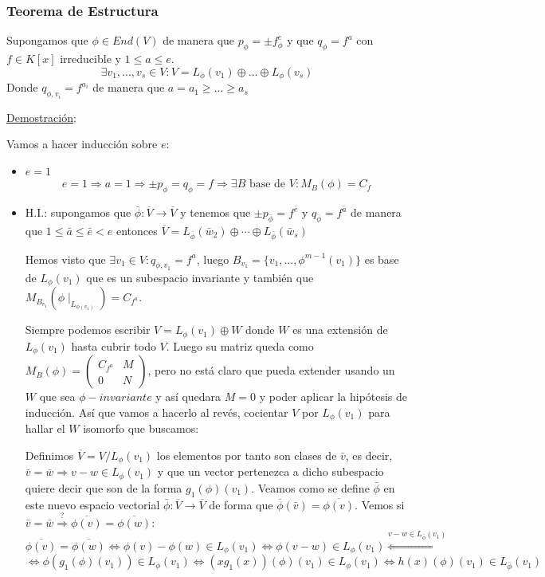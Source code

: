 \documentclass[10pt,a4paper,openright]{book}
\begin{document}
\subsubsection*{Teorema de Estructura}
Supongamos que $\phi\in End(V)$ de manera que $p_\phi =\pm f_\phi^e$ y que $q_\phi=f^a$ con $f\in K[x]$ irreducible y $1\leq a\leq e$.
$$\exists v_1, ..., v_s\in V: V=L_\phi(v_1)\oplus... \oplus L_\phi(v_s)$$
Donde $q_{\phi, v_i}=f^{a_i}$ de manera que $a=a_1\geq ... \geq a_s$

\underline{Demostración}:

Vamos a hacer inducción sobre $e$:
\begin{itemize}
\item $e=1$
$$e=1\Rightarrow a=1\Rightarrow \pm p_\phi=q_\phi=f\Rightarrow \exists B\mbox{ base de }V: M_B(\phi)=C_f$$

\item H.I.: supongamos que $\bar{\phi}: \overline{V}\rightarrow \overline{V}$ y tenemos que $\pm p_{\bar{\phi}}=f^{\bar{e}}$ y $q_{\overline{\phi}}=f^{\bar{a}}$ de manera que $1\leq \bar{a}\leq \bar{e}< e$ entonces $\overline{V}=L_{\bar{\phi}}(\bar{w}_2)\oplus \cdots \oplus L_{\bar{\phi}}(\bar{w}_s)$ 

Hemos visto que $\exists v_1\in V: q_{\phi,v_1}=f^a$, luego $B_{v_1}=\{v_1, ..., \phi^{m-1}(v_1)\}$ es base de $L_\phi(v_1)$ que es un subespacio invariante y también que $M_{B_{v_1}}(\phi\mid_{L_{\phi(v_1)}})=C_{f^a}$.

Siempre podemos escribir $V=L_\phi(v_1)\oplus W$ donde $W$ es una extensión de $L_\phi(v_1)$ hasta cubrir todo $V$. Luego su matriz queda como $M_B(\phi)=\begin{pmatrix}
C_{f^a} & M\\ 0 & N
\end{pmatrix}$, pero no está claro que pueda extender usando un $W$ que sea $\phi-invariante$ y así quedara $M=0$ y poder aplicar la hipótesis de inducción. Así que vamos a hacerlo al revés, cocientar  $V$ por $L_\phi(v_1)$ para hallar el $W$ isomorfo que buscamos:

Definimos $\overline{V}=V/L_\phi(v_1)$ los elementos por tanto son clases de $\bar{v}$, es decir, $\bar{v}=\bar{w}\Rightarrow v-w\in L_\phi(v_1)$ y que un vector pertenezca a dicho subespacio quiere decir que son de la forma $g_1(\phi)(v_1)$. Veamos como se define $\bar{\phi}$ en este nuevo espacio vectorial $\bar{\phi}: \overline{V}\rightarrow \overline{V}$ de forma que $\overline{\phi}(\bar{v})=\overline{\phi(v)}$. Vemos si $\bar{v}=\bar{w}\stackrel{?}{\Rightarrow} \overline{\phi(v)}=\overline{\phi(w)}$:
$$\overline{\phi(v)}=\overline{\phi(w)}\Leftrightarrow \phi(v)-\phi(w)\in  L_\phi(v_1)\Leftrightarrow \phi(v-w)\in L_\phi(v_1)\stackrel{v-w\in L_{\bar{\phi}}(v_1)}{\Leftrightarrow}$$
$$\Leftrightarrow \phi(g_1(\phi)(v_1))\in L_\phi(v_1)\Leftrightarrow (xg_1(x))(\phi)(v_1)\in L_\phi(v_1)\Leftrightarrow h(x)(\phi)(v_1)\in L_{\bar{\phi}}(v_1)$$


\end{itemize}
\end{document}
